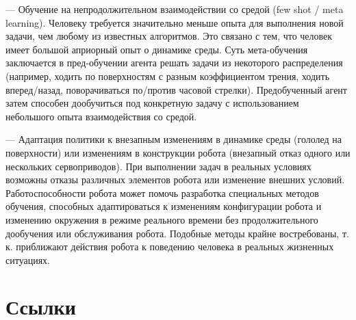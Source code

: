 --- Обучение на непродолжительном взаимодействии со средой (few shot / meta learning). Человеку требуется значительно меньше опыта для выполнения новой задачи, чем любому из известных алгоритмов. Это связано с тем, что человек имеет большой априорный опыт о динамике среды. Суть мета-обучения заключается в пред-обучении агента решать задачи из некоторого распределения (например, ходить по поверхностям с разным коэффициентом трения, ходить вперед/назад, поворачиваться по/против часовой стрелки). Предобученный агент затем способен дообучиться под конкретную задачу с использованием небольшого опыта взаимодействия со средой. 

--- Адаптация политики к внезапным изменениям в динамике среды (гололед на поверхности) или изменениям в конструкции робота (внезапный отказ одного или нескольких сервоприводов). При выполнении задач в реальных условиях возможны отказы различных элементов робота или изменение внешних условий. Работоспособности робота может помочь разработка специальных методов обучения, способных адаптироваться к изменениям конфигурации робота и изменению окружения в режиме реального времени без продолжительного дообучения или обслуживания робота. Подобные методы крайне востребованы, т. к. приближают действия робота к поведению человека в реальных жизненных ситуациях.

\section{Ссылки}\label{sec:ch1/sec2}


\FloatBarrier
